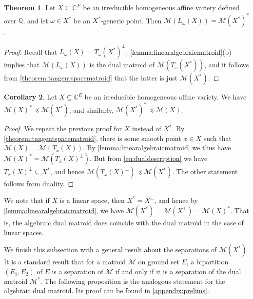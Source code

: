 \documentclass[11pt,a4paper,dvipsnames]{scrartcl}
\theoremstyle{definition}
\newtheorem{theorem}{Theorem}[section]
\newtheorem{corollary}[theorem]{Corollary}
\newcommand{\CC}{\mathbb{C}}
\newcommand{\QQ}{\mathbb{Q}}
\newcommand{\algmat}[1]{\mathcal{M}(#1)}
\begin{document}
\begin{theorem}\label{theorem:contactlocusmatroid}
    Let $X \subseteq \CC^E$ be an irreducible homogeneous affine variety defined over $\QQ$, and let $\omega \in X^*$ be an $X^*$-generic point. Then $\algmat{L_\omega(X)} = \algmat{X^*}^*$. %
\end{theorem}
\begin{proof}
    Recall that $L_\omega(X) = {T_\omega(X^*)}^\perp$. \cref{lemma:linearalgebraicmatroid}(b) implies that $\algmat{L_\omega(X)}$ is the dual matroid of $\algmat{T_{\omega}(X^*)}$, and it follows from \cref{theorem:tangentspacematroid} that the latter is just $\algmat{X^*}$.
\end{proof}

\begin{corollary}\label{corollary:dualrelationships}
    Let $X \subseteq \CC^E$ be an irreducible homogeneous affine variety. We have $\algmat{X}^* \preceq \algmat{X^*}$, and similarly, $\algmat{X^*}^* \preceq \algmat{X}$.
\end{corollary}
\begin{proof}
    We repeat the previous proof for $X$ instead of $X^*$. By \cref{theorem:tangentspacematroid}, there is some smooth point $x \in X$ such that $\algmat{X} = \algmat{T_x(X)}$. By \cref{lemma:linearalgebraicmatroid} we thus have $\algmat{X}^* = \algmat{{T_x(X)}^\perp}$. But from \cref{eq:dualdescription} we have ${T_x(X)}^\perp \subseteq X^*$, and hence $\algmat{{T_x(X)}^\perp} \preceq \algmat{X^*}$. The other statement follows from duality.
\end{proof}

We note that if $X$ is a linear space, then $X^* = X^\perp$, and hence by \cref{lemma:linearalgebraicmatroid}, we have $\algmat{X^*} = \algmat{X^\perp} = \algmat{X}^*$. That is, the algebraic dual matroid does coincide with the dual matroid in the case of linear spaces.

We finish this subsection with a general result about the separations of $\algmat{X^*}$. It is a standard result that for a matroid $\mathcal{M}$ on ground set $E$, a bipartition $(E_1,E_2)$ of $E$ is a separation of $\mathcal{M}$ if and only if it is a separation of the dual matroid $\mathcal{M}^*$. The following proposition is the analogous statement for the algebraic dual matroid. Its proof can be found in \cref{appendix:prelims}.
\end{document}
